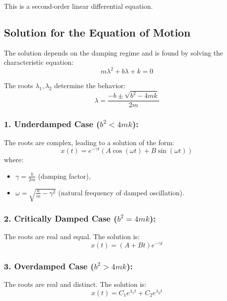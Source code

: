 \documentclass{article}
\begin{document}
This is a second-order linear differential equation.

\subsection*{Solution for the Equation of Motion}
The solution depends on the damping regime and is found by solving the characteristic equation:
\begin{equation*}
    m\lambda^2 + b\lambda + k = 0
\end{equation*}

The roots $\lambda_1, \lambda_2$ determine the behavior:
\begin{equation*}
    \lambda = \frac{-b \pm \sqrt{b^2 - 4mk}}{2m}
\end{equation*}

\subsubsection*{1. Underdamped Case ($b^2 < 4mk$):}
The roots are complex, leading to a solution of the form:
\begin{equation*}
    x(t) = e^{-\gamma t} \left(A\cos(\omega t) + B\sin(\omega t)\right)
\end{equation*}
where:
\begin{itemize}
    \item $\gamma = \frac{b}{2m}$ (damping factor),
    \item $\omega = \sqrt{\frac{k}{m} - \gamma^2}$ (natural frequency of damped oscillation).
\end{itemize}

\subsubsection*{2. Critically Damped Case ($b^2 = 4mk$):}
The roots are real and equal. The solution is:
\begin{equation*}
    x(t) = (A + Bt)e^{-\gamma t}
\end{equation*}

\subsubsection*{3. Overdamped Case ($b^2 > 4mk$):}
The roots are real and distinct. The solution is:
\begin{equation*}
   x(t) = C_1e^{\lambda_1 t} + C_2e^{\lambda_2 t} 
\end{equation*}
\end{document}
